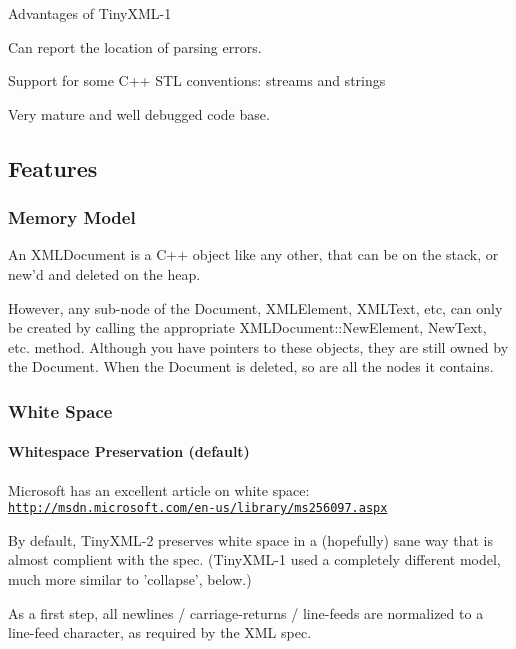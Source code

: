 Advantages of Tiny\+X\+M\+L-\/1


\begin{DoxyEnumerate}
\item Can report the location of parsing errors.
\item Support for some C++ S\+T\+L conventions\+: streams and strings
\item Very mature and well debugged code base.
\end{DoxyEnumerate}

\subsection*{Features }

\subsubsection*{Memory Model}

An X\+M\+L\+Document is a C++ object like any other, that can be on the stack, or new'd and deleted on the heap.

However, any sub-\/node of the Document, X\+M\+L\+Element, X\+M\+L\+Text, etc, can only be created by calling the appropriate X\+M\+L\+Document\+::\+New\+Element, New\+Text, etc. method. Although you have pointers to these objects, they are still owned by the Document. When the Document is deleted, so are all the nodes it contains.

\subsubsection*{White Space}

\paragraph*{Whitespace Preservation (default)}

Microsoft has an excellent article on white space\+: \href{http://msdn.microsoft.com/en-us/library/ms256097.aspx}{\tt http\+://msdn.\+microsoft.\+com/en-\/us/library/ms256097.\+aspx}

By default, Tiny\+X\+M\+L-\/2 preserves white space in a (hopefully) sane way that is almost complient with the spec. (Tiny\+X\+M\+L-\/1 used a completely different model, much more similar to 'collapse', below.)

As a first step, all newlines / carriage-\/returns / line-\/feeds are normalized to a line-\/feed character, as required by the X\+M\+L spec.

